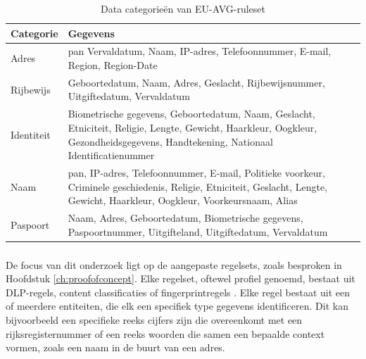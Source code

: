 \begin{table}[h]
    \centering
    \small
    \scriptsize
    \begin{tabular}{p{5cm}p{10cm}}
    \toprule
    \textbf{Categorie} & \textbf{Gegevens} \\
    \midrule
    Adres & \gls{pan} Vervaldatum, Naam, IP-adres, Telefoonnummer, E-mail, Region, Region-Date \\
    Rijbewijs & Geboortedatum, Naam, Adres, Geslacht, Rijbewijsnummer, Uitgiftedatum, Vervaldatum \\
    Identiteit & Biometrische gegevens, Geboortedatum, Naam, Geslacht, Etniciteit, Religie, Lengte, Gewicht, Haarkleur, Oogkleur, Gezondheidsgegevens, Handtekening, Nationaal Identificatienummer \\
    Naam & \gls{pan}, IP-adres, Telefoonnummer, E-mail, Politieke voorkeur, Criminele geschiedenis, Religie, Etniciteit, Geslacht, Lengte, Gewicht, Haarkleur, Oogkleur, Voorkeursnaam, Alias \\
    Paspoort & Naam, Adres, Geboortedatum, Biometrische gegevens, Paspoortnummer, Uitgifteland, Uitgiftedatum, Vervaldatum \\
    \bottomrule
    \end{tabular}
    \caption{Data categorieën van EU-AVG-ruleset \autocite{Netskope2023GDPR}}
    \label{tab:EU-AVG Netskope}
\end{table}

\subsubsection{}
\label{subsubsec:aangepaste-regels-literatuurstudie}

De focus van dit onderzoek ligt op de aangepaste regelsets, zoals besproken in Hoofdstuk \ref{ch:proofofconcept}. 
Elke regelset, oftewel profiel genoemd, bestaat uit DLP-regels, content classificaties of fingerprintregels \autocite{Netskope2025CreateProfiles}.
Elke regel bestaat uit een of meerdere entiteiten, die elk een specifiek type gegevens identificeren. 
Dit kan bijvoorbeeld een specifieke reeks cijfers zijn die overeenkomt met een rijksregisternummer of een reeks woorden die samen een bepaalde context vormen, zoals een naam in de buurt van een adres. 

\subsection{}
\label{subsec:entiteit-literatuurstudie}

